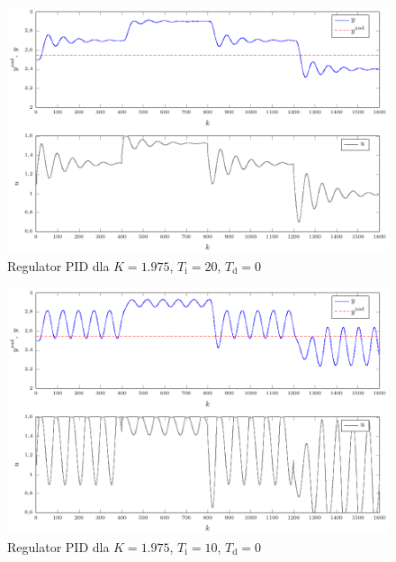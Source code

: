 \begin{figure}[tb] 
\centering 
\includegraphics[scale=1]{rysunki/zapisz_pdf/PID_K=1.975_Ti=20.00_Td=0.00.pdf} 
\caption{Regulator PID dla $K=\num{1.975}$, $T_{\mathrm{i}}=20$, $T_{\mathrm{d}}=0$} 
\label{r_pgfplots_PID_K=1.975_Ti=20.00_Td=0.00} 
\end{figure}

\begin{figure}[tb] 
\centering 
\includegraphics[scale=1]{rysunki/zapisz_pdf/PID_K=1.975_Ti=10.00_Td=0.00.pdf} 
\caption{Regulator PID dla $K=\num{1.975}$, $T_{\mathrm{i}}=10$, $T_{\mathrm{d}}=0$} 
\label{r_pgfplots_PID_K=1.975_Ti=10.00_Td=0.00} 
\end{figure}

